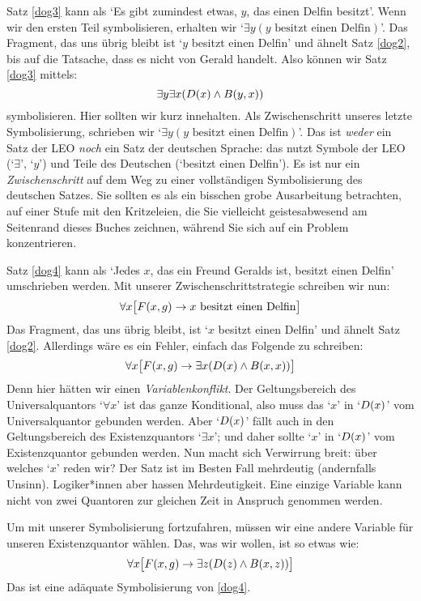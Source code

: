 Satz \ref{dog3} kann als `Es gibt zumindest etwas, $y$, das einen Delfin besitzt'. Wenn wir den ersten Teil symbolisieren, erhalten wir `$\exists y(y\text{ besitzt einen Delfin})$'. Das Fragment, das uns übrig bleibt ist `$y$ besitzt einen Delfin' und ähnelt Satz \ref{dog2}, bis auf die Tatsache, dass es nicht von Gerald handelt. Also können wir Satz \ref{dog3} mittels:
$$\exists y \exists x(\mathord{D}(x) \wedge \mathord{B}(y,x))$$
symbolisieren. Hier sollten wir kurz innehalten. Als Zwischenschritt unseres letzte Symbolisierung, schrieben wir `$\exists y(y\text{ besitzt einen Delfin})$'. Das ist \emph{weder} ein Satz der LEO \emph{noch} ein Satz der deutschen Sprache: das nutzt Symbole der LEO (`$\exists$', `$y$') und Teile des Deutschen (`besitzt einen Delfin'). Es ist nur ein \emph{Zwischenschritt} auf dem Weg zu einer vollständigen Symbolisierung des deutschen Satzes. Sie sollten es als ein bisschen grobe Ausarbeitung betrachten, auf einer Stufe mit den Kritzeleien, die Sie vielleicht geistesabwesend am Seitenrand dieses Buches zeichnen, während Sie sich auf ein Problem konzentrieren.  

Satz \ref{dog4} kann als `Jedes $x$, das ein Freund Geralds ist, besitzt einen Delfin' umschrieben werden. Mit unserer Zwischenschrittstrategie schreiben wir nun:
$$\forall x \bigl[\mathord{F}(x,g) \rightarrow x \text{ besitzt einen Delfin}\bigr]$$
Das Fragment, das uns übrig bleibt, ist `$x$ besitzt einen Delfin' und ähnelt Satz \ref{dog2}. Allerdings wäre es ein Fehler, einfach das Folgende zu schreiben:
$$\forall x \bigl[\mathord{F}(x,g) \rightarrow \exists x(\mathord{D}(x) \wedge \mathord{B}(x,x))\bigr]$$
Denn hier hätten wir einen \emph{Variablenkonflikt}. Der Geltungsbereich des Universalquantors `$\forall x$' ist das ganze Konditional, also muss das `$x$' in `$\mathord{D}(x)$' vom Universalquantor gebunden werden. Aber  `$\mathord{D}(x)$' fällt auch in den Geltungsbereich des Existenzquantors `$\exists x$'; und daher sollte `$x$' in `$\mathord{D}(x)$' vom Existenzquantor gebunden werden. Nun macht sich Verwirrung breit: über welches `$x$' reden wir? Der Satz ist im Besten Fall mehrdeutig (andernfalls Unsinn). Logiker*innen aber hassen Mehrdeutigkeit. Eine einzige Variable kann nicht von zwei Quantoren zur gleichen Zeit in Anspruch genommen werden.

Um mit unserer Symbolisierung fortzufahren, müssen wir eine andere Variable für unseren Existenzquantor wählen. Das, was wir wollen, ist so etwas wie:
$$\forall x\bigl[\mathord{F}(x,g) \rightarrow\exists z(\mathord{D}(z) \wedge \mathord{B}(x,z))\bigr]$$
Das ist eine adäquate Symbolisierung von \ref{dog4}.

